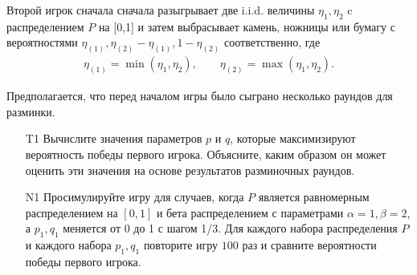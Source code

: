 \documentclass[12pt]{article}
\begin{document}
Второй игрок сначала сначала разыгрывает две i.i.d. величины \(\eta_1,\eta_2\) c распределением \(P\) на [0,1] и затем выбрасывает камень, ножницы или бумагу с вероятностями \(\eta_{(1)}, \eta_{(2)} - \eta_{(1)}, 1- \eta_{(2)}\) соответственно, где 
\begin{eqnarray*}
\eta_{(1)} = \min(\eta_1, \eta_2), \qquad 
\eta_{(2)} = \max(\eta_1, \eta_2).
\end{eqnarray*}

Предполагается, что перед началом игры было сыграно несколько раундов для разминки.


\begin{enumerate}
\item[T1] Вычислите значения параметров \(p\) и \(q\), которые максимизируют вероятность победы  первого игрока. Объясните, каким образом он может оценить эти значения на основе результатов разминочных раундов.
\item[N1] Просимулируйте игру для случаев, когда \(P\) является равномерным распределением на \([0,1]\) и бета распределением с параметрами \(\alpha=1, \beta=2\), а \(p_1, q_1\)  меняется от 0 до 1 с шагом 1/3. Для каждого набора распределения \(P\) и каждого набора \(p_1, q_1\) повторите игру \(100\) раз и сравните вероятности победы первого игрока. %
\end{enumerate}
\end{document}
